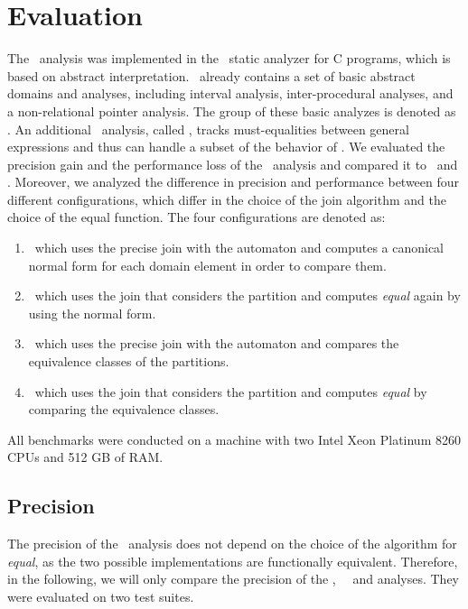 \chapter{Evaluation}\label{chapter:evaluation}


The \cpo\ analysis was implemented in the \goblint\ static analyzer for C programs, which is based on abstract interpretation.
\goblint\ already contains a set of basic abstract domains and analyses,
including interval analysis, inter-procedural analyses, and a non-relational pointer analysis.
The group of these basic analyzes is denoted as \base.
An additional \goblint\ analysis, called \vareq, tracks must-equalities between general expressions
and thus can handle a subset of the behavior of \cpo.
We evaluated the precision gain and the performance loss of the \cpo\ analysis and compared it to \base\ and \vareq.
Moreover, we analyzed the difference in precision and performance between four different
configurations, which differ in the choice of the join algorithm and the choice of the equal function.
The four configurations are denoted as:
\begin{enumerate}
    \item \cpou\, which uses the precise join with the automaton and computes a canonical normal form for each domain element in order to compare them.
    \item \cpod\, which uses the join that considers the partition and computes \emph{equal} again by using the normal form.
    \item \cpot\, which uses the precise join with the automaton and compares the equivalence classes of the partitions.
    \item \cpoq\, which uses the join that considers the partition and computes \emph{equal} by comparing the equivalence classes.
\end{enumerate}
All benchmarks were conducted on a machine with two Intel Xeon Platinum 8260 CPUs and 512 GB of RAM.

\section{Precision}

The precision of the \cpo\ analysis does not depend on the choice of the algorithm for \emph{equal}, as the two possible implementations are functionally equivalent.
Therefore, in the following, we will only compare the precision of the \cpou, \cpod\, \base\, and \vareq analyses.
They were evaluated on two test suites.


